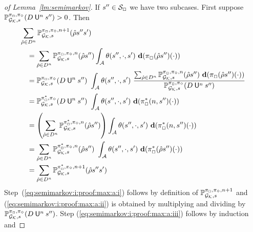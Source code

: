 \begin{proof}[of Lemma~\ref{lm:semimarkov}]
  If $s''\in\mathcal{S}_{\Box}$ we have two subcases. First suppose
  $\mathbb{P}^{\pi_{{\Box}},\pi_{{\Diamond}}}_{{\mathcal{G}_{\mathcal{K}}},s}(D \mathbin{\mathsf{U}}^n s'') > 0$.
  Then
  \begin{align}
    \sum_{\hat{\rho} \in D^n} \Prob^{\strat_{\maxplay},\strat_{\minplay},n+1}_{\StochGK,s}(\hat{\rho}s''s') \hspace{-9em} &\notag\\
    & =
    \sum_{\hat{\rho} \in D^n} \Prob^{\strat_{\maxplay},\strat_{\minplay},n}_{\StochGK,s}(\hat{\rho}s'')\int_{\sgactions}\sgtrans(s'',\cdot,s')\ \diff(\strat_{\maxplay}(\hat{\rho}s'')(\cdot))
    \label{eq:semimarkov:i:proof:max:a:i}\\
    & =
    \Prob^{\strat_{\maxplay},\strat_{\minplay}}_{\StochGK,s}(D \Until^n s'')\mult
    \int_{\sgactions}\sgtrans(s'',\cdot,s')\mult
    \frac{\sum_{\hat{\rho} \in D^n} \Prob^{\strat_{\maxplay},\strat_{\minplay},n}_{\StochGK,s}(\hat{\rho}s'')\ \diff(\strat_{\maxplay}(\hat{\rho}s'')(\cdot))}{\Prob^{\strat_{\maxplay},\strat_{\minplay}}_{\StochGK,s}(D \Until^n s'')}
    \label{eq:semimarkov:i:proof:max:a:ii}\\
    & =
    \Prob^{\starredstrat_{\maxplay},\strat_{\minplay}}_{\StochGK,s}(D \Until^n s'')\mult
    \int_{\sgactions}\sgtrans(s'',\cdot,s')\ \diff(\starredstrat_{\maxplay}(n,s'')(\cdot))
    \label{eq:semimarkov:i:proof:max:a:iii}\\
    & =
    \left(\sum_{\hat{\rho}\in D^n}\Prob^{\starredstrat_{\maxplay},\strat_{\minplay},n}_{\StochGK,s}(\hat{\rho}s'')\right)
    \int_{\sgactions}\sgtrans(s'',\cdot,s')\ \diff(\starredstrat_{\maxplay}(n,s'')(\cdot))
    \label{eq:semimarkov:i:proof:max:a:iv}\\
    & =
    \sum_{\hat{\rho}\in D^n}\Prob^{\starredstrat_{\maxplay},\strat_{\minplay},n}_{\StochGK,s}(\hat{\rho}s'')\mult
    \int_{\sgactions}\sgtrans(s'',\cdot,s')\ \diff(\starredstrat_{\maxplay}(\hat{\rho}s'')(\cdot))
    \label{eq:semimarkov:i:proof:max:a:v}\\
    & =
    \sum_{\hat{\rho} \in D^n} \Prob^{\starredstrat_{\maxplay},\strat_{\minplay},n+1}_{\StochGK,s}(\hat{\rho}s''s')
    \label{eq:semimarkov:i:proof:max:a:vi}
  \end{align}
  Step~(\ref{eq:semimarkov:i:proof:max:a:i}) follows by definition
  of $\mathbb{P}^{\pi_{{\Box}},\pi_{{\Diamond}},n+1}_{{\mathcal{G}_{\mathcal{K}}},s}$ and
  (\ref{eq:semimarkov:i:proof:max:a:ii}) is obtained by multiplying
  and dividing by
  $\mathbb{P}^{\pi_{{\Box}},\pi_{{\Diamond}}}_{{\mathcal{G}_{\mathcal{K}}},s}(D \mathbin{\mathsf{U}}^n s'')$.
  Step (\ref{eq:semimarkov:i:proof:max:a:iii}) follows by induction and

\end{proof}
